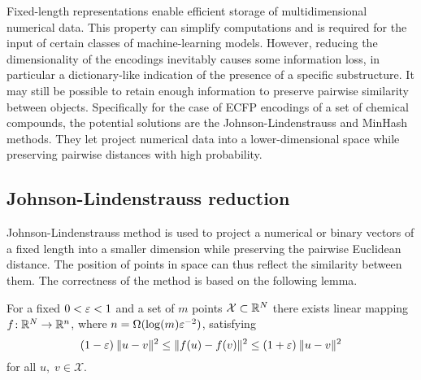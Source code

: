 Fixed-length representations enable efficient storage of multidimensional numerical data. This property can simplify computations and is required for the input of certain classes of machine-learning models. However, reducing the dimensionality of the encodings inevitably causes some information loss, in particular a dictionary-like indication of the presence of a specific substructure. It may still be possible to retain enough information to preserve pairwise similarity between objects. Specifically for the case of ECFP encodings of a set of chemical compounds, the potential solutions are the Johnson-Lindenstrauss and MinHash methods. They let project numerical data into a lower-dimensional space while preserving pairwise distances with high probability.

\subsection{Johnson-Lindenstrauss reduction}
Johnson-Lindenstrauss method is used to project a numerical or binary vectors of a fixed length into a smaller dimension while preserving the pairwise Euclidean distance. The position of points in space can thus reflect the similarity between them. The correctness of the method is based on the following lemma.
\begin{lemma}
\label{lemma:JL}
For a fixed \( 0 < \varepsilon < 1 \) and a set of \( m \) points \( \mathcal{X} \subset \mathbb{R}^N \) there exists linear mapping \( f\!:\mathbb{R}^N \rightarrow \mathbb{R}^n \), where \( n = \Omega(\log(m)\varepsilon^{-2}) \), satisfying
\[
    (1-\varepsilon)\:\| u-v \|^2 \leq \| f(u)-f(v) \|^2 \leq (1+\varepsilon)\:\| u-v \|^2
\]
for all \( u,\; v \in \mathcal{X} \).
\end{lemma}
